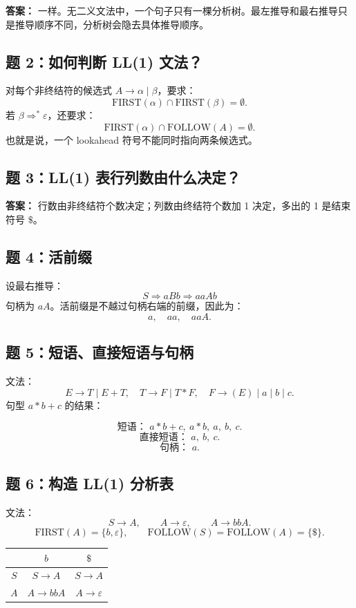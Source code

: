 \documentclass[UTF8,fontset=none,11pt]{ctexart}
\newcommand{\eps}{\varepsilon}
\newcommand{\FIRST}{\ensuremath{\mathrm{FIRST}}}
\newcommand{\FOLLOW}{\ensuremath{\mathrm{FOLLOW}}}
\begin{document}
\textbf{答案：} 一样。无二义文法中，一个句子只有一棵分析树。最左推导和最右推导只是推导顺序不同，分析树会隐去具体推导顺序。

\subsection*{题 2：如何判断 LL(1) 文法？}

对每个非终结符的候选式 \(A\to\alpha\mid\beta\)，要求：
\[
\FIRST(\alpha)\cap\FIRST(\beta)=\emptyset.
\]
若 \(\beta\Rightarrow^*\eps\)，还要求：
\[
\FIRST(\alpha)\cap\FOLLOW(A)=\emptyset.
\]
也就是说，一个 lookahead 符号不能同时指向两条候选式。

\subsection*{题 3：LL(1) 表行列数由什么决定？}

\textbf{答案：} 行数由非终结符个数决定；列数由终结符个数加 1 决定，多出的 1 是结束符号 \(\$\)。

\subsection*{题 4：活前缀}

设最右推导：
\[
S\Rightarrow aBb\Rightarrow aaAb
\]
句柄为 \(aA\)。活前缀是不越过句柄右端的前缀，因此为：
\[
a,\quad aa,\quad aaA.
\]

\subsection*{题 5：短语、直接短语与句柄}

文法：
\[
E\to T\mid E+T,\quad T\to F\mid T*F,\quad F\to (E)\mid a\mid b\mid c.
\]
句型 \(a*b+c\) 的结果：

\[
\text{短语： } a*b+c,\ a*b,\ a,\ b,\ c.
\]
\[
\text{直接短语： } a,\ b,\ c.
\]
\[
\text{句柄： } a.
\]

\subsection*{题 6：构造 LL(1) 分析表}

文法：
\[
S\to A,\qquad A\to\eps,\qquad A\to bbA.
\]
\[
\FIRST(A)=\{b,\eps\},\qquad \FOLLOW(S)=\FOLLOW(A)=\{\$\}.
\]

\begin{center}
\begin{tabular}{c|cc}
\toprule
 & \(b\) & \(\$\) \\
\midrule
\(S\) & \(S\to A\) & \(S\to A\) \\
\(A\) & \(A\to bbA\) & \(A\to\eps\) \\
\bottomrule
\end{tabular}
\end{center}
\end{document}
